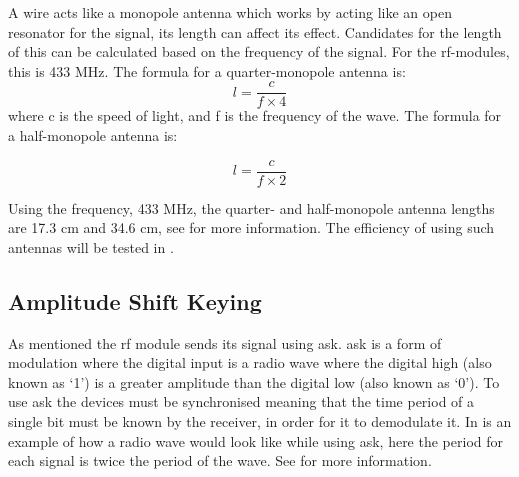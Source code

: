 A wire acts like a monopole antenna which works by acting like an open resonator for the signal, its length can affect its effect. 
Candidates for the length of this can be calculated based on the frequency of the signal.
For the \gls{rf}-modules, this is 433 MHz.
The formula for a quarter-monopole antenna is: 
\begin{equation} \label{QMA}
l = \frac{c}{f \times 4}
\end{equation}
where c is the speed of light, and f is the frequency of the wave.
The formula for a half-monopole antenna is: 

\begin{equation}
l = \frac{c}{f \times 2}
\end{equation}

\noindent
Using the frequency, 433 MHz, the quarter- and half-monopole antenna lengths are 17.3 cm and 34.6 cm, see \cite{AntennaLength} for more information.
The efficiency of using such antennas will be tested in .

\subsection{Amplitude Shift Keying}\label{subsub:ask}
As mentioned the \gls{rf} module sends its signal using \gls{ask}.
\gls{ask} is a form of modulation where the digital input is a radio wave where the digital high (also known as \enquote*{1}) is a greater amplitude than the digital low (also known as \enquote*{0}).
To use \gls{ask} the devices must be synchronised meaning that the time period of a single bit must be known by the receiver, in order for it to demodulate it. 
In  is an example of how a radio wave would look like while using \gls{ask}, here the period for each signal is twice the period of the wave. See \cite{ASKnFSK} for more information.  

